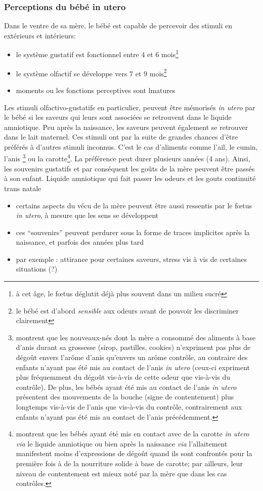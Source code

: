 \documentclass[french]{article}
\begin{document}
			\subsubsection{Perceptions du bébé in utero}
				Dans le ventre de sa mère, le bébé est capable de percevoir des stimuli en extérieurs et intérieurs\cite{busnel2010}:
				\begin{itemize}
					\item le système gustatif est fonctionnel entre 4 et 6 mois\footnote{à cet âge, le fœtus déglutit déjà plus souvent dans un milieu sucré}
					\item le système olfactif se développe vers 7 et 9 mois\footnote{le bébé est d'abord \textit{sensible} aux odeurs avant de pouvoir les discriminer clairement}
					\item moments ou les fonctions perceptives sont lmatures	
				\end{itemize}
				Les stimuli olfactivo-gustatifs en particulier, peuvent être mémorisés \textit{in utero} par le bébé si les saveurs qui leurs sont associées se retrouvent dans le liquide amniotique. Peu après la naissance, les saveurs peuvent également se retrouver dans le lait maternel. Ces stimuli ont par la suite de grandes chances d'être préférés à d'autres stimuli inconnus. C'est le cas d'aliments comme l'ail, le cumin, l'anis \cite{schaal2000}\footnote{\cite{schaal2000} montrent que les nouveaux-nés dont la mère a consommé des aliments à base d'anis durant sa grossesse (sirop, pastilles, cookies) n'expriment pas plus de dégoût envers l'arôme d'anis qu'envers un arôme contrôle, au contraire des enfants n'ayant pas été mis au contact de l'anis \textit{in utero} (ceux-ci expriment plus fréquemment du dégoût vis-à-vis de cette odeur que vis-à-vis du contrôle). De plus, les bébés ayant été mis au contact de l'anis \textit{in utero} présentent des mouvements de la bouche (signe de contentement) plus longtemps vis-à-vis de l'anis que vis-à-vis du contrôle, contrairement aux enfants n'ayant pas été mis au contact de l'anis précédemment.} ou la carotte\cite{mennella2001}\footnote{\cite{mennella2001} montrent que les bébés ayant été mis en contact avec de la carotte \textit{in utero via} le liquide amniotique ou bien après la naissance \textit{via} l'allaitement manifestent moins d'expressions de dégoût quand ils sont confrontés pour la première fois à de la nourriture solide à base de carotte; par ailleurs, leur niveau de contentement est mieux noté par la mère que dans les cas contrôles.}. La préférence peut durer plusieurs années (4 ans). Ainsi, les souvenirs gustatifs et par conséquent les goûts de la mère peuvent être passés à son enfant.
				Liquide amniotique qui fait passer les odeurs et les gouts
				continuité trans natale
		\begin{itemize}
			\item certains aspects du vécu de la mère peuvent être aussi ressentis par le fœtus \textit{in utero}, à mesure que les sens se développent
			\item ces ``souvenirs'' peuvent perdurer sous la forme de traces implicites après la naissance, et parfois des années plus tard
			\item par exemple : attirance pour certaines saveurs, stress vis à vis de certaines situations (?)
		\end{itemize}
\end{document}
